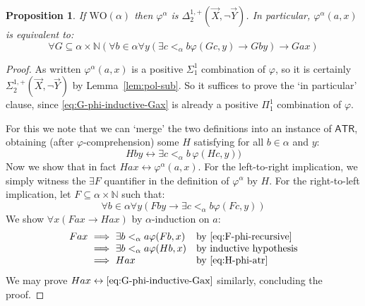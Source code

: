 \documentclass[10pt,a4paper]{amsart}
\theoremstyle{plain}
\newtheorem{proposition}[proposition]{Proposition}
\theoremstyle{definition}
\renewcommand{\phi}{\varphi}
\theoremstyle{plain}
\theoremstyle{definition} %
\newcommand{\Nat}{\mathbb{N}}
\newcommand{\limp}{\to}
\newcommand{\liff}{\leftrightarrow}
\newcommand{\Sin}[2]{\Sigma^{#1}_{#2}}
\newcommand{\Pin}[2]{\Pi^{#1}_{#2}}
\newcommand{\Din}[2]{\Delta^{#1}_{#2}}
\newcommand{\posSin}[3]{\Sin{#1,+}{#2} (#3)}
\newcommand{\posDin}[3]{\Din{#1,+}{#2} (#3)}
\newcommand{\posnegSin}[4]{\posSin{#1}{#2}{#3, \lnot #4}}
\newcommand{\posnegDin}[4]{\posDin{#1}{#2}{#3, \lnot #4}}
\newcommand{\ATR}{\mathsf{ATR}}
\newcommand{\WO}{\mathrm{WO}}
\begin{document}
\begin{proposition}
\label{prop:approx-is-posD12}
If $\WO(\alpha)$ then $\phi^\alpha$ is $\posnegDin 1 2 {\vec X}{\vec Y}$.
In particular, $\phi^\alpha(a,x)$ is equivalent to:
\begin{equation}
    \label{eq:G-phi-inductive-Gax}
\forall G \subseteq \alpha \times \Nat
(\forall b \in \alpha \forall y (\exists c <_\alpha b \phi (Gc,y) \limp Gby) \limp Gax )
\end{equation}
\end{proposition}
\begin{proof}
As written $\phi^\alpha (a,x)$ is a positive $\Sin 1 1 $ combination of $\phi$, so it is certainly $\posnegSin 1 2 {\vec X}{\vec Y}$ by Lemma~\ref{lem:pol-sub}.
So it suffices to prove the `in particular' clause,
since \eqref{eq:G-phi-inductive-Gax} is already a positive $\Pin 1 1 $ combination of $\phi$.%

For this we note that we can `merge' the two definitions into an instance of $\ATR$, obtaining (after $\phi$-comprehension) some $H$ satisfying for all $b\in \alpha $ and $y$:
\begin{equation}
    \label{eq:H-phi-atr}
    Hby \liff \exists c <_\alpha b\,  \phi(Hc,y))
\end{equation}
Now we show that in fact $Hax \liff \phi^\alpha(a,x) $. For the left-to-right implication, we simply witness the $\exists F$ quantifier in the definition of $\phi^\alpha$ by $H$.
For the right-to-left implication, let $F\subseteq \alpha \times \Nat$ such that:
\begin{equation}
    \label{eq:F-phi-recursive}
\forall b \in \alpha \forall y (Fby \limp \exists c <_\alpha b \phi (Fc,y))
\end{equation}
We show $\forall x(Fax \limp Hax)$ by $\alpha$-induction on $a$:
\[
\begin{array}{r@{\ \implies \ }ll}
     Fax & \exists b<_\alpha a \phi (Fb,x) & \text{by \eqref{eq:F-phi-recursive}} \\
        & \exists b<_{\alpha} a \phi (Hb,x) & \text{by inductive hypothesis} \\
        & Hax & \text{by \eqref{eq:H-phi-atr}}
\end{array}
\]
We may prove $Hax \liff \eqref{eq:G-phi-inductive-Gax} $ similarly, concluding the proof.
\end{proof}
\end{document}
